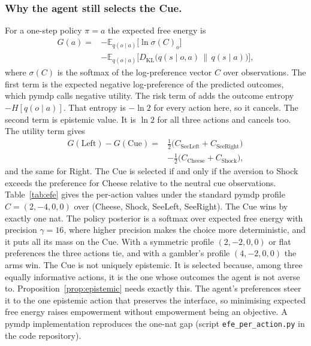 \documentclass[pdflatex,sn-apa]{sn-jnl}%
\theoremstyle{definition}
\providecommand{\E}{\mathbb{E}}
\providecommand{\KL}{D_{\mathrm{KL}}}
\begin{document}
\subsubsection{Why the agent still selects the Cue.}
For a one-step policy $\pi = a$ the expected free energy is
\begin{equation}
\begin{split}
G(a) = {} & -\E_{q(o \mid a)}\big[\ln \sigma(C)_o\big] \\
& - \E_{q(o \mid a)}\big[\KL\big(q(s \mid o, a)\,\|\,q(s \mid a)\big)\big],
\end{split}
\label{eq:efe}
\end{equation}
where $\sigma(C)$ is the softmax of the log-preference vector $C$ over observations. The first term is the expected negative log-preference of the predicted outcomes, which pymdp calls negative utility. The risk term of \citet{friston2015active} adds the outcome entropy $-H[q(o \mid a)]$. That entropy is $-\ln 2$ for every action here, so it cancels. The second term is epistemic value. It is $\ln 2$ for all three actions and cancels too. The utility term gives
\begin{equation}
\begin{split}
G(\text{Left}) - G(\text{Cue}) = {} & \tfrac12\big(C_{\text{SeeLeft}} + C_{\text{SeeRight}}\big) \\
& - \tfrac12\big(C_{\text{Cheese}} + C_{\text{Shock}}\big),
\end{split}
\label{eq:risk}
\end{equation}
and the same for Right. The Cue is selected if and only if the aversion to Shock exceeds the preference for Cheese relative to the neutral cue observations. Table~\ref{tab:efe} gives the per-action values under the standard pymdp profile $C = (2, -4, 0, 0)$ over (Cheese, Shock, SeeLeft, SeeRight). The Cue wins by exactly one nat. The policy posterior is a softmax over expected free energy with precision $\gamma = 16$, where higher precision makes the choice more deterministic, and it puts all its mass on the Cue. With a symmetric profile $(2,-2,0,0)$ or flat preferences the three actions tie, and with a gambler's profile $(4,-2,0,0)$ the arms win. The Cue is not uniquely epistemic. It is selected because, among three equally informative actions, it is the one whose outcomes the agent is not averse to. Proposition~\ref{prop:epistemic} needs exactly this. The agent's preferences steer it to the one epistemic action that preserves the interface, so minimising expected free energy raises empowerment without empowerment being an objective. A pymdp implementation reproduces the one-nat gap (script \texttt{efe\_per\_action.py} in the code repository).
\end{document}
